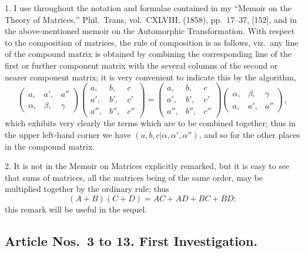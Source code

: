 \documentclass[11pt,a4paper]{article}
\theoremstyle{plain}
\begin{document}
1. I use throughout the notation and formulae contained in my ``Memoir on the Theory of Matrices,'' Phil.\ Trans, vol.~CXLVIII. (1858), pp.~17--37, [152], and in the above-mentioned memoir on the Automorphic Transformation. With respect to the composition of matrices, the rule of composition is as follows, viz.\ any line of the compound matrix is obtained by combining the corresponding line of the first or further component matrix with the several columns of the second or nearer component matrix; it is very convenient to indicate this by the algorithm,
\[
\begin{pmatrix}
a, & a', & a'' \\
\alpha, & \beta, & \gamma
\end{pmatrix}
\begin{pmatrix}
a, & b, & c \\
a', & b', & c' \\
a'', & b'', & c''
\end{pmatrix}
=
\begin{pmatrix}
a, & b, & c \\
a', & b', & c' \\
a'', & b'', & c''
\end{pmatrix}
\begin{pmatrix}
\alpha, & \beta, & \gamma \\
a, & a', & a''
\end{pmatrix},
\]
which exhibits very clearly the terms which are to be combined together; thus in the upper left-hand corner we have $(a,b,c  |  \alpha, \alpha', \alpha'')$, and so for the other places in the compound matrix.

2. It is not in the Memoir on Matrices explicitly remarked, but it is easy to see that sums of matrices, all the matrices being of the same order, may be multiplied together by the ordinary rule; thus
\[
(A + B)(C + D) = AC + AD + BC + BD:
\]
this remark will be useful in the sequel.

\subsection*{Article Nos.~3 to 13. First Investigation.}
\end{document}
